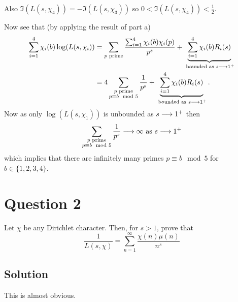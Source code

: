 \documentclass{unswmaths}
\begin{document}
Also $ \Im( L(s, \chi_4) ) = - \Im( L(s, \chi_3) ) $ so $ 0 < \Im( L(s, \chi_4) ) < \frac{1}{2} $.

Now see that (by applying the result of part a)
\begin{align*}
	\sum_{i=1}^4 \chi_i(b) \log( L(s, \chi_i)) &= \sum_{p \text{ prime}} \frac{\sum_{i=1}^{4}\chi_i(b)\chi_i(p)}{p^s} + \underbrace{\sum_{i=1}^4 \chi_i(b)R_i(s)}_{\text{ bounded as } s \longrightarrow 1^+}\\
		&= 4\sum_{\substack{p \text{ prime} \\ p \equiv b\mod 5 }} \frac{1}{p^s} + \underbrace{\sum_{i=1}^4 \chi_i(b)R_i(s)}_{\text{ bounded as } s \longrightarrow 1^+}.
\end{align*}
Now as only $ \log(L(s, \chi_1)) $ is unbounded as $ s \longrightarrow 1^+ $ then 
$$
\sum_{\substack{p \text{ prime} \\ p \equiv b\mod 5 }} \frac{1}{p^s} \longrightarrow \infty \text{ as } s \longrightarrow 1^+
$$
which implies that there are infinitely many primes $ p \equiv b \mod 5 $ for $ b \in \{ 1,2,3,4 \} $.

\section*{Question 2}
Let $ \chi $ be any Dirichlet character. Then, for $ s > 1 $, prove that
$$
	\frac{1}{L(s, \chi)} = \sum_{n=1}^\infty \frac{\chi(n)\mu(n)}{n^s}
$$
\subsection*{Solution}
This is almost obvious.
\end{document}
